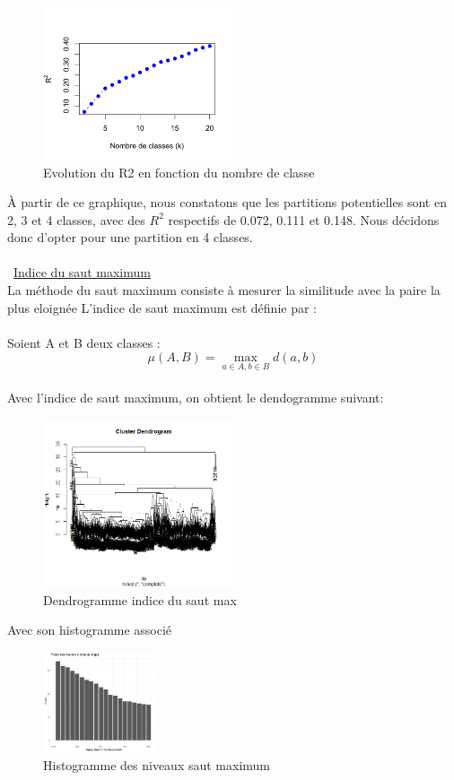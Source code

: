 \documentclass{article}
\begin{document}
\begin{figure}[H]
    \centering
    \includegraphics[width=0.5\textwidth]{R222.png}
    \caption{Evolution du R2 en fonction du nombre de classe}
    \label{fig:EvolR2} 
\end{figure}
À partir de ce graphique, nous constatons que les partitions potentielles sont en 2, 3 et 4 classes, avec des \( R^2 \) respectifs de 0.072, 0.111 et 0.148. Nous décidons donc d'opter pour une partition en 4 classes.
\\\\
\textbullet\ \underline{Indice du saut maximum}
\\
La méthode du saut maximum consiste à mesurer la similitude avec la paire la plus eloignée
L'indice de saut maximum est définie par :
\\
\\
Soient A et B deux classes :
\[
\mu(A,B) = \max_{a \in A , b \in B} d(a,b)
\]
\\
Avec l'indice de saut maximum, on obtient le dendogramme suivant:
\\
\begin{figure}[H]
    \centering
    \includegraphics[width=0.5\textwidth]{dendromax4.png}
    \caption{Dendrogramme  indice du saut max}
    \label{fig:dendmax} 
\end{figure}
Avec son histogramme associé
\\
\begin{figure}[H]
    \centering
    \includegraphics[width=0.3\textwidth]{histomax4.png}
    \caption{Histogramme des niveaux saut maximum}
    \label{fig:histomax} 
\end{figure}
\end{document}
